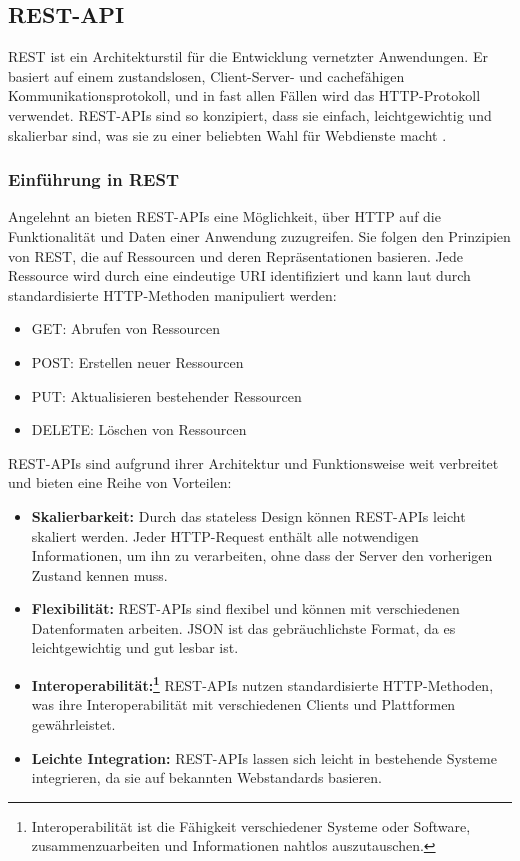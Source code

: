 \subsection{REST-API}

REST ist ein Architekturstil für die Entwicklung vernetzter Anwendungen. Er basiert auf einem zustandslosen, Client-Server- und cachefähigen Kommunikationsprotokoll, und in fast allen Fällen wird das HTTP-Protokoll verwendet. REST-APIs sind so konzipiert, dass sie einfach, leichtgewichtig und skalierbar sind, was sie zu einer beliebten Wahl für Webdienste macht \cite{REST:2024}.

\subsubsection{Einführung in REST}
Angelehnt an \cite{REST:2024} bieten REST-APIs eine Möglichkeit, über HTTP auf die Funktionalität und Daten einer Anwendung zuzugreifen. Sie folgen den Prinzipien von REST, die auf Ressourcen und deren Repräsentationen basieren. Jede Ressource wird durch eine eindeutige URI identifiziert und kann laut \cite[S.4]{Kornienko_2021} durch standardisierte HTTP-Methoden manipuliert werden:
\begin{itemize}
	\item GET: Abrufen von Ressourcen
	\item POST: Erstellen neuer Ressourcen
	\item PUT: Aktualisieren bestehender Ressourcen
	\item DELETE: Löschen von Ressourcen
\end{itemize}
REST-APIs sind aufgrund ihrer Architektur und Funktionsweise weit verbreitet und bieten eine Reihe von Vorteilen:

\begin{itemize}
	\item \textbf{Skalierbarkeit:} Durch das stateless Design können REST-APIs leicht skaliert werden. Jeder HTTP-Request enthält alle notwendigen Informationen, um ihn zu verarbeiten, ohne dass der Server den vorherigen Zustand kennen muss.
	\item \textbf{Flexibilität:} REST-APIs sind flexibel und können mit verschiedenen Datenformaten arbeiten. JSON ist das gebräuchlichste Format, da es leichtgewichtig und gut lesbar ist.
	\item \textbf{Interoperabilität:\footnote{Interoperabilität ist die Fähigkeit verschiedener Systeme oder Software, zusammenzuarbeiten und Informationen nahtlos auszutauschen\cite{wiki:listing}.}} REST-APIs nutzen standardisierte HTTP-Methoden, was ihre Interoperabilität mit verschiedenen Clients und Plattformen gewährleistet.
	\item \textbf{Leichte Integration:} REST-APIs lassen sich leicht in bestehende Systeme integrieren, da sie auf bekannten Webstandards basieren.
\end{itemize}

